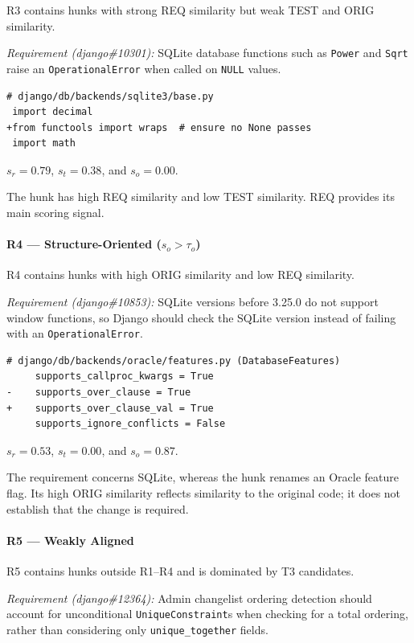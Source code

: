 R3 contains hunks with strong REQ similarity but weak TEST and ORIG similarity.

\smallskip
\noindent\textit{Requirement (django\#10301):}
SQLite database functions such as \texttt{Power} and \texttt{Sqrt} raise an \texttt{OperationalError} when called on \texttt{NULL} values.

\begin{lstlisting}
# django/db/backends/sqlite3/base.py
 import decimal
+from functools import wraps  # ensure no None passes
 import math
\end{lstlisting}

\noindent
$s_r=0.79$, $s_t=0.38$, and $s_o=0.00$.

The hunk has high REQ similarity and low TEST similarity. REQ provides its main scoring signal.

\paragraph{R4 --- Structure-Oriented \textnormal{($s_o>\tau_o$)}}

R4 contains hunks with high ORIG similarity and low REQ similarity.

\smallskip
\noindent\textit{Requirement (django\#10853):}
SQLite versions before 3.25.0 do not support window functions, so Django should check the SQLite version instead of failing with an \texttt{OperationalError}.

\begin{lstlisting}
# django/db/backends/oracle/features.py (DatabaseFeatures)
     supports_callproc_kwargs = True
-    supports_over_clause = True
+    supports_over_clause_val = True
     supports_ignore_conflicts = False
\end{lstlisting}

\noindent
$s_r=0.53$, $s_t=0.00$, and $s_o=0.87$.

The requirement concerns SQLite, whereas the hunk renames an Oracle feature flag. Its high ORIG similarity reflects similarity to the original code; it does not establish that the change is required.

\paragraph{R5 --- Weakly Aligned}

R5 contains hunks outside R1--R4 and is dominated by T3 candidates.

\smallskip
\noindent\textit{Requirement (django\#12364):}
Admin changelist ordering detection should account for unconditional \texttt{UniqueConstraint}s when checking for a total ordering, rather than considering only \texttt{unique\_together} fields.

